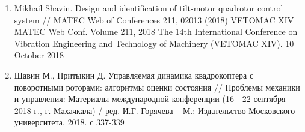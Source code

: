 \begin{enumerate}
	\item Mikhail Shavin. Design and identification of tilt-motor quadrotor control system 
	// MATEC Web of Conferences 211, 02013 (2018) VETOMAC XIV
	MATEC Web Conf. Volume 211, 2018 The 14th International Conference on Vibration Engineering and Technology of Machinery (VETOMAC XIV). 10 October 2018
	
	\item Шавин М., Притыкин Д. Управляемая динамика квадрокоптера с поворотными роторами: алгоритмы оценки состояния // Проблемы механики и управления: Материалы международной конференции (16 - 22 сентября 2018 г., г. Махачкала) / ред. И.Г. Горячева – М.: Издательство Московского университета, 2018. с 337-339
\end{enumerate}